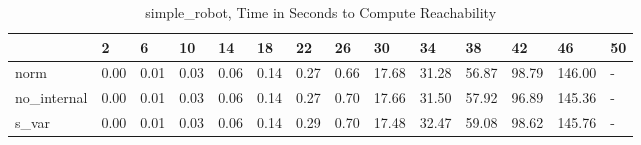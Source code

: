 \begin{table}
\caption{simple_robot, Time in Seconds to Compute Reachability}
\label{simple_robot_states_time}
\begin{tabular}{llllllllllllll}
\toprule
 & 2 & 6 & 10 & 14 & 18 & 22 & 26 & 30 & 34 & 38 & 42 & 46 & 50 \\
\midrule
norm & 0.00 & 0.01 & 0.03 & 0.06 & 0.14 & 0.27 & 0.66 & 17.68 & 31.28 & 56.87 & 98.79 & 146.00 & - \\
no_internal & 0.00 & 0.01 & 0.03 & 0.06 & 0.14 & 0.27 & 0.70 & 17.66 & 31.50 & 57.92 & 96.89 & 145.36 & - \\
s_var & 0.00 & 0.01 & 0.03 & 0.06 & 0.14 & 0.29 & 0.70 & 17.48 & 32.47 & 59.08 & 98.62 & 145.76 & - \\
\bottomrule
\end{tabular}
\end{table}
